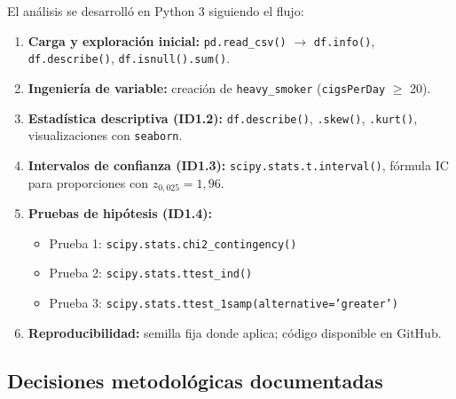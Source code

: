 \documentclass[11pt,a4paper]{article}
\begin{document}
El análisis se desarrolló en Python 3 siguiendo el flujo:

\begin{enumerate}[noitemsep]
  \item \textbf{Carga y exploración inicial:} \texttt{pd.read\_csv()} $\rightarrow$
        \texttt{df.info()}, \texttt{df.describe()}, \texttt{df.isnull().sum()}.
  \item \textbf{Ingeniería de variable:} creación de \texttt{heavy\_smoker}
        (\texttt{cigsPerDay} $\geq$ 20).
  \item \textbf{Estadística descriptiva (ID1.2):} \texttt{df.describe()},
        \texttt{.skew()}, \texttt{.kurt()}, visualizaciones con \texttt{seaborn}.
  \item \textbf{Intervalos de confianza (ID1.3):} \texttt{scipy.stats.t.interval()},
        fórmula IC para proporciones con $z_{0{,}025} = 1{,}96$.
  \item \textbf{Pruebas de hipótesis (ID1.4):}
    \begin{itemize}[noitemsep]
      \item Prueba 1: \texttt{scipy.stats.chi2\_contingency()}
      \item Prueba 2: \texttt{scipy.stats.ttest\_ind()}
      \item Prueba 3: \texttt{scipy.stats.ttest\_1samp(alternative='greater')}
    \end{itemize}
  \item \textbf{Reproducibilidad:} semilla fija donde aplica; código disponible en GitHub.
\end{enumerate}

\subsection{Decisiones metodológicas documentadas}
\end{document}
